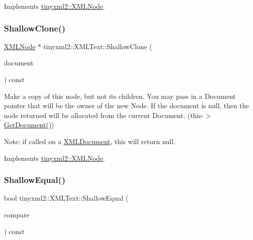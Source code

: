 Implements \mbox{\hyperlink{classtinyxml2_1_1_x_m_l_node_a81e66df0a44c67a7af17f3b77a152785}{tinyxml2\+::\+X\+M\+L\+Node}}.

\mbox{\label{classtinyxml2_1_1_x_m_l_text_a86d265c93152726c8c6831e9594840e6}} 
\subsubsection{\texorpdfstring{ShallowClone()}{ShallowClone()}}
{\footnotesize\ttfamily \mbox{\hyperlink{classtinyxml2_1_1_x_m_l_node}{X\+M\+L\+Node}} $\ast$ tinyxml2\+::\+X\+M\+L\+Text\+::\+Shallow\+Clone (\begin{DoxyParamCaption}\item[{\mbox{\hyperlink{classtinyxml2_1_1_x_m_l_document}{X\+M\+L\+Document}} $\ast$}]{document }\end{DoxyParamCaption}) const\hspace{0.3cm}{\ttfamily [virtual]}}

Make a copy of this node, but not its children. You may pass in a Document pointer that will be the owner of the new Node. If the \textquotesingle{}document\textquotesingle{} is null, then the node returned will be allocated from the current Document. (this-\/$>$\mbox{\hyperlink{classtinyxml2_1_1_x_m_l_node_af343d1ef0b45c0020e62d784d7e67a68}{Get\+Document()}})

Note\+: if called on a \mbox{\hyperlink{classtinyxml2_1_1_x_m_l_document}{X\+M\+L\+Document}}, this will return null. 

Implements \mbox{\hyperlink{classtinyxml2_1_1_x_m_l_node_a8402cbd3129d20e9e6024bbcc0531283}{tinyxml2\+::\+X\+M\+L\+Node}}.

\mbox{\label{classtinyxml2_1_1_x_m_l_text_a99d8bce4dc01df889126e047f358cdfc}} 
\subsubsection{\texorpdfstring{ShallowEqual()}{ShallowEqual()}}
{\footnotesize\ttfamily bool tinyxml2\+::\+X\+M\+L\+Text\+::\+Shallow\+Equal (\begin{DoxyParamCaption}\item[{const \mbox{\hyperlink{classtinyxml2_1_1_x_m_l_node}{X\+M\+L\+Node}} $\ast$}]{compare }\end{DoxyParamCaption}) const\hspace{0.3cm}{\ttfamily [virtual]}}


